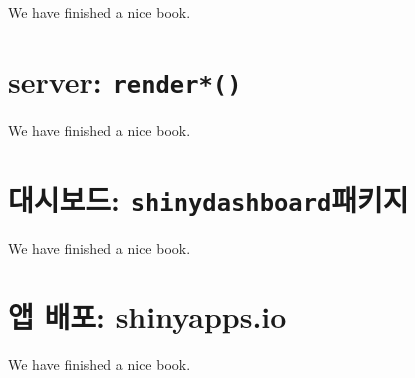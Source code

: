 \documentclass[]{book}
\begin{document}
We have finished a nice book.

\chapter{\texorpdfstring{server:
\texttt{render*()}}{server: render*()}}\label{server}

We have finished a nice book.

\chapter{\texorpdfstring{대시보드:
\texttt{shinydashboard}패키지}{대시보드: shinydashboard패키지}}\label{dashboard}

We have finished a nice book.

\chapter{앱 배포: shinyapps.io}\label{deploy}

We have finished a nice book.


\end{document}
